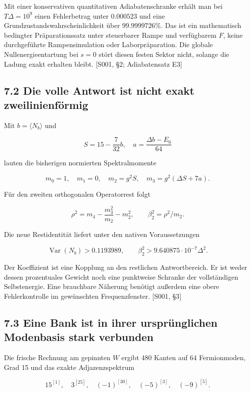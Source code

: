 Mit einer konservativen quantitativen Adiabatenschranke erhält man bei
\(T\Delta=10^9\) einen Fehlerbetrag unter \(0.000523\) und eine
Grundzustandswahrscheinlichkeit über \(99.9999726\%\). Das ist ein
mathematisch bedingter Präparationssatz unter steuerbarer Rampe und
verfügbarem \(F\), keine durchgeführte Rampensimulation oder
Laborpräparation. Die globale Nullenergieentartung bei \(s=0\) stört
diesen festen Sektor nicht, solange die Ladung exakt erhalten bleibt.
{[}S001, §2; Adiabatensatz E3{]}

\subsection{7.2 Die volle Antwort ist nicht exakt
zweilinienförmig}\label{die-volle-antwort-ist-nicht-exakt-zweilinienfuxf6rmig}

Mit \(b=\langle N_b\rangle\) und

\[S=15-\frac7{32}b,\quad a=\frac{\Delta b-E_0}{64}\]

lauten die bisherigen normierten Spektralmomente

\[m_0=1,\quad m_1=0,\quad m_2=g^2S,\quad
m_3=g^2(\Delta S+7a).\]

Für den zweiten orthogonalen Operatorrest folgt

\[\rho^2=m_4-\frac{m_3^2}{m_2}-m_2^2,\qquad
\beta_2^2=\rho^2/m_2.\]

Die neue Restidentität liefert unter den nativen Voraussetzungen

\[\operatorname{Var}(N_b)>0.1193989,
\qquad\beta_2^2>9.640875\cdot10^{-7}\Delta^2.\]

Der Koeffizient ist eine Kopplung an den restlichen Antwortbereich. Er
ist weder dessen prozentuales Gewicht noch eine punktweise Schranke der
vollständigen Selbstenergie. Eine brauchbare Näherung benötigt außerdem
eine obere Fehlerkontrolle im gewünschten Frequenzfenster. {[}S001,
§3{]}

\subsection{7.3 Eine Bank ist in ihrer ursprünglichen Modenbasis stark
verbunden}\label{eine-bank-ist-in-ihrer-urspruxfcnglichen-modenbasis-stark-verbunden}

Die frische Rechnung am gepinnten \(W\) ergibt 480 Kanten auf 64
Fermionmoden, Grad 15 und das exakte Adjazenzspektrum

\[15^{[1]},\quad3^{[25]},\quad(-1)^{[30]},\quad(-5)^{[3]},\quad(-9)^{[5]}.\]

